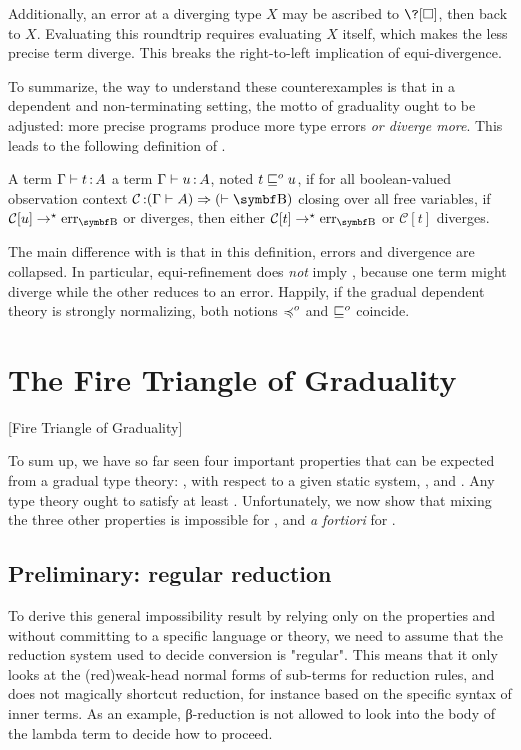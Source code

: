 Additionally, an error at a diverging type $X$ may be ascribed to $\?[\uni]$,
then back to $X$. Evaluating this
roundtrip requires evaluating $X$ itself, which makes the less
precise term diverge. This breaks the right-to-left implication of
equi-divergence.

To summarize,
the way to understand these counterexamples is that 
in a dependent and non-terminating setting, 
the motto of graduality ought to be adjusted: more precise programs produce
more type errors \emph{or diverge more}. This leads to the following definition
of .

\begin{definition}
\label{def:obsref}
  A term $\Gamma \vdash t \operatorname{:} A$  a term
  $\Gamma \vdash u \operatorname{:} A$, noted $t \sqsubseteq^{o} u$, if for all boolean-valued observation context
  $\mathcal{C} \ty (\Gamma \vdash A) \Rightarrow (\vdash \Bool)$ closing over all
  free variables, if $\mathcal{C}[u] \red \err[\Bool]$ or diverges,
  then either $\mathcal{C}[t] \red \err[\Bool]$ or $\mathcal{C}[t]$ diverges.
\end{definition}

The main difference with  is that
in this definition, errors and divergence are collapsed.
In particular, equi-refinement does \emph{not} imply ,
because one term might diverge while the other reduces to an error.
Happily, if the gradual dependent theory is strongly normalizing, both notions
 $\preccurlyeq^{o}$ and  $\sqsubseteq^{o}$
coincide.

\section{The Fire Triangle of Graduality}[Fire Triangle of Graduality]
\label{sec:fire-triangle}

To sum up, we have so far seen four important properties that can be expected from a
gradual type theory:
,  with respect to a given static system, ,
and . Any type theory ought to satisfy at least .
Unfortunately, we now show that mixing the three other properties is impossible for ,
and \textit{a fortiori} for .

\subsection{Preliminary: regular reduction}
To derive this general impossibility result by relying only on the properties
and without committing to a specific language or theory,
we need to assume that the reduction system used to decide conversion is "regular".
This means that it only looks at the \kl(red){weak-head} normal forms of
sub-terms for reduction rules,
and does not magically shortcut reduction,
for instance based on the specific syntax of inner terms.
As an example, β-reduction is not allowed to look into the body of
the lambda term to decide how to proceed.

